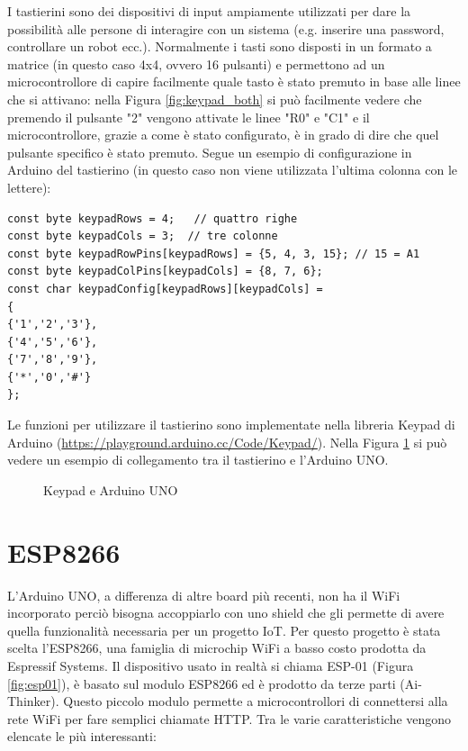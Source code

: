 \documentclass[12pt]{report}
\begin{document}
I tastierini sono dei dispositivi di input ampiamente utilizzati per dare la possibilità alle persone di interagire con un sistema (e.g$.$ inserire una password, controllare un robot ecc.). Normalmente i tasti sono disposti in un formato a matrice (in questo caso 4x4, ovvero 16 pulsanti) e permettono ad un microcontrollore di capire facilmente quale tasto è stato premuto in base alle linee che si attivano: nella Figura \ref{fig:keypad_both} si può facilmente vedere che premendo il pulsante "2" vengono attivate le linee "R0" e "C1" e il microcontrollore, grazie a come è stato configurato, è in grado di dire che quel pulsante specifico è stato premuto. Segue un esempio di configurazione in Arduino del tastierino (in questo caso non viene utilizzata l'ultima colonna con le lettere): 
\begin{lstlisting}
const byte keypadRows = 4;   // quattro righe
const byte keypadCols = 3;  // tre colonne
const byte keypadRowPins[keypadRows] = {5, 4, 3, 15}; // 15 = A1
const byte keypadColPins[keypadCols] = {8, 7, 6};
const char keypadConfig[keypadRows][keypadCols] =
{
{'1','2','3'},
{'4','5','6'},
{'7','8','9'},
{'*','0','#'}
};
\end{lstlisting}
Le funzioni per utilizzare il tastierino sono implementate nella libreria Keypad di Arduino (\url{https://playground.arduino.cc/Code/Keypad/}). Nella Figura \ref{fig:keypad_uno} si può vedere un esempio di collegamento tra il tastierino e l'Arduino UNO.


\begin{figure}
	\caption{Keypad e Arduino UNO}
	\label{fig:keypad_uno}
\end{figure}


%
\section{ESP8266}\label{sec:esp8266}
%

L'Arduino UNO, a differenza di altre board più recenti, non ha il WiFi incorporato perciò bisogna accoppiarlo con uno shield che gli permette di avere quella funzionalità necessaria per un progetto IoT. Per questo progetto è stata scelta l'ESP8266, una famiglia di microchip WiFi a basso costo prodotta da Espressif Systems. Il dispositivo usato in realtà si chiama ESP-01 (Figura \ref{fig:esp01}), è basato sul modulo ESP8266 ed è prodotto da terze parti (Ai-Thinker). Questo piccolo modulo permette a microcontrollori di connettersi alla rete WiFi per fare semplici chiamate HTTP.
Tra le varie caratteristiche vengono elencate le più interessanti:
\end{document}
